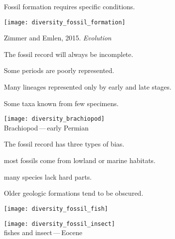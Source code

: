 \documentclass[t]{beamer}
\newcommand{\futuyma}[1]{%
	\ifthenelse{\isempty{#1}}%
	{Futuyma \& Kirkpatrick 2017, 4th ed.}%
	{Fig.~#1~Futuyma \& Kirkpatrick 2017, 4th ed.}%
}
\newcommand{\backskip}{\vspace{-0.5\baselineskip}}
\begin{document}

{
\begin{frame}[b]

\end{frame}
}


\begin{frame}{Fossil formation requires specific conditions.}

\backskip

\texttt{[image: diversity\_fossil\_formation]}
	

\tinyfill \textcopyright Zimmer and Emlen, 2015. \textit{Evolution}

\end{frame}



\begin{frame}{The fossil record will always be incomplete.}

\backskip

\begin{multicols}{2}

\hangpara Some periods are poorly represented.

\hangpara Many lineages represented only by early and late stages.

\hangpara Some taxa known from few specimens.

\columnbreak

\centering
\noindent\texttt{[image: diversity\_brachiopod]}\\
Brachiopod\,—\,early Permian

\end{multicols}

\end{frame}


\begin{frame}{The fossil record has three types of bias.}

\backskip

\begin{multicols}{2}

\hangpara {} most fossils come from lowland or marine habitats.


\hangpara {} many species lack hard parts.


\hangpara {} Older geologic formations tend to be obscured.

\columnbreak

\centering
\noindent\texttt{[image: diversity\_fossil\_fish]}

\smallskip

\noindent\texttt{[image: diversity\_fossil\_insect]}\\
fishes and insect\,—\,Eocene

\end{multicols}

\end{frame}
\end{document}
